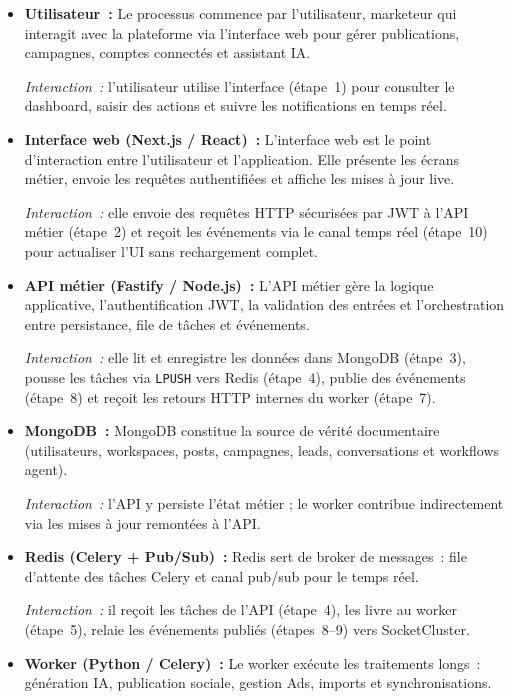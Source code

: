 \documentclass[12pt,a4paper]{report}
\numberwithin{figure}{chapter}
\numberwithin{table}{chapter}
\begin{document}
\begin{itemize}[leftmargin=2em,itemsep=6pt]

\item \textbf{Utilisateur~:}
Le processus commence par l’utilisateur, marketeur qui interagit avec la plateforme via l’interface web pour gérer publications, campagnes, comptes connectés et assistant IA.

\textit{Interaction~:} l’utilisateur utilise l’interface (étape~1) pour consulter le dashboard, saisir des actions et suivre les notifications en temps réel.

\item \textbf{Interface web (Next.js / React)~:}
L’interface web est le point d’interaction entre l’utilisateur et l’application. Elle présente les écrans métier, envoie les requêtes authentifiées et affiche les mises à jour live.

\textit{Interaction~:} elle envoie des requêtes HTTP sécurisées par JWT à l’API métier (étape~2) et reçoit les événements via le canal temps réel (étape~10) pour actualiser l’UI sans rechargement complet.

\item \textbf{API métier (Fastify / Node.js)~:}
L’API métier gère la logique applicative, l’authentification JWT, la validation des entrées et l’orchestration entre persistance, file de tâches et événements.

\textit{Interaction~:} elle lit et enregistre les données dans MongoDB (étape~3), pousse les tâches via \texttt{LPUSH} vers Redis (étape~4), publie des événements (étape~8) et reçoit les retours HTTP internes du worker (étape~7).

\item \textbf{MongoDB~:}
MongoDB constitue la source de vérité documentaire (utilisateurs, workspaces, posts, campagnes, leads, conversations et workflows agent).

\textit{Interaction~:} l’API y persiste l’état métier ; le worker contribue indirectement via les mises à jour remontées à l’API.

\item \textbf{Redis (Celery + Pub/Sub)~:}
Redis sert de broker de messages~: file d’attente des tâches Celery et canal pub/sub pour le temps réel.

\textit{Interaction~:} il reçoit les tâches de l’API (étape~4), les livre au worker (étape~5), relaie les événements publiés (étapes~8--9) vers SocketCluster.

\item \textbf{Worker (Python / Celery)~:}
Le worker exécute les traitements longs~: génération IA, publication sociale, gestion Ads, imports et synchronisations.


\end{itemize}
\end{document}
